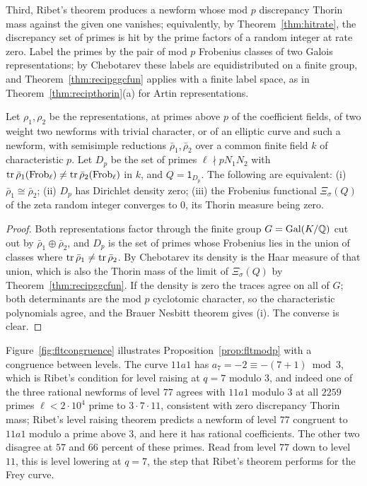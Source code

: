Third, Ribet's theorem produces a newform whose mod $p$ discrepancy Thorin mass against the given one vanishes; equivalently, by Theorem~\ref{thm:hitrate}, the discrepancy set of primes is hit by the prime factors of a random integer at rate zero. Label the primes by the pair of mod $p$ Frobenius classes of two Galois representations; by Chebotarev these labels are equidistributed on a finite group, and Theorem~\ref{thm:recipggcfun} applies with a finite label space, as in Theorem~\ref{thm:recipthorin}(a) for Artin representations.

\begin{proposition}\label{prop:fltmodp}
Let $\rho_1,\rho_2$ be the representations, at primes above $p$ of the coefficient fields, of two weight two newforms with trivial character, or of an elliptic curve and such a newform, with semisimple reductions $\bar\rho_1,\bar\rho_2$ over a common finite field $k$ of characteristic $p$. Let $D_p$ be the set of primes $\ell\nmid pN_1N_2$ with $\operatorname{tr}\bar\rho_1(\operatorname{Frob}_\ell)\ne\operatorname{tr}\bar\rho_2(\operatorname{Frob}_\ell)$ in $k$, and $Q=\mathsf 1_{D_p}$. The following are equivalent: (i) $\bar\rho_1\cong\bar\rho_2$; (ii) $D_p$ has Dirichlet density zero; (iii) the Frobenius functional $\Xi_\sigma(Q)$ of the zeta random integer converges to $0$, its Thorin measure being zero.
\end{proposition}

\begin{proof}
Both representations factor through the finite group $G=\operatorname{Gal}(K/\mathbb{Q})$ cut out by $\bar\rho_1\oplus\bar\rho_2$, and $D_p$ is the set of primes whose Frobenius lies in the union of classes where $\operatorname{tr}\bar\rho_1\ne\operatorname{tr}\bar\rho_2$. By Chebotarev its density is the Haar measure of that union, which is also the Thorin mass of the limit of $\Xi_\sigma(Q)$ by Theorem~\ref{thm:recipggcfun}. If the density is zero the traces agree on all of $G$; both determinants are the mod $p$ cyclotomic character, so the characteristic polynomials agree, and the Brauer Nesbitt theorem gives (i). The converse is clear.
\end{proof}

Figure~\ref{fig:fltcongruence} illustrates Proposition~\ref{prop:fltmodp} with a congruence between levels. The curve $11a1$ has $a_7=-2\equiv-(7+1)\bmod3$, which is Ribet's condition \cite{ribet1984} for level raising at $q=7$ modulo $3$, and indeed one of the three rational newforms of level $77$ agrees with $11a1$ modulo $3$ at all $2259$ primes $\ell<2\cdot10^4$ prime to $3\cdot7\cdot11$, consistent with zero discrepancy Thorin mass; Ribet's level raising theorem predicts a newform of level $77$ congruent to $11a1$ modulo a prime above $3$, and here it has rational coefficients. The other two disagree at $57$ and $66$ percent of these primes. Read from level $77$ down to level $11$, this is level lowering at $q=7$, the step that Ribet's theorem performs for the Frey curve.

